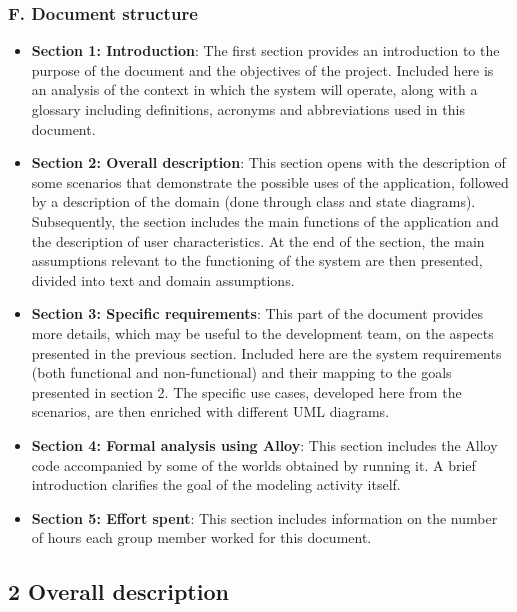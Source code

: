 \documentclass[
]{article}
\providecommand{\tightlist}{%
  \setlength{\itemsep}{0pt}\setlength{\parskip}{0pt}}
\begin{document}
\hypertarget{f.-document-structure}{%
\subsubsection{F. Document structure}\label{f.-document-structure}}

\begin{itemize}
\tightlist
\item
  \textbf{Section 1: Introduction}: The first section provides an
  introduction to the purpose of the document and the objectives of the
  project. Included here is an analysis of the context in which the
  system will operate, along with a glossary including definitions,
  acronyms and abbreviations used in this document.
\item
  \textbf{Section 2: Overall description}: This section opens with the
  description of some scenarios that demonstrate the possible uses of
  the application, followed by a description of the domain (done through
  class and state diagrams). Subsequently, the section includes the main
  functions of the application and the description of user
  characteristics. At the end of the section, the main assumptions
  relevant to the functioning of the system are then presented, divided
  into text and domain assumptions.
\item
  \textbf{Section 3: Specific requirements}: This part of the document
  provides more details, which may be useful to the development team, on
  the aspects presented in the previous section. Included here are the
  system requirements (both functional and non-functional) and their
  mapping to the goals presented in section 2. The specific use cases,
  developed here from the scenarios, are then enriched with different
  UML diagrams.
\item
  \textbf{Section 4: Formal analysis using Alloy}: This section includes
  the Alloy code accompanied by some of the worlds obtained by running
  it. A brief introduction clarifies the goal of the modeling activity
  itself.
\item
  \textbf{Section 5: Effort spent}: This section includes information on
  the number of hours each group member worked for this document.
\end{itemize}

\hypertarget{overall-description}{%
\subsection{2 Overall description}\label{overall-description}}
\end{document}
